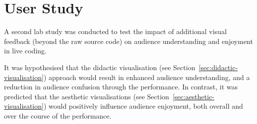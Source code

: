 
\chapter{User Study}
\label{chap:user-study}

A second lab study was conducted to test the impact of additional
visual feedback (beyond the raw source code) on audience understanding
and enjoyment in live coding.

It was hypothesised that the didactic visualisation (see Section~\ref{sec:didactic-visualisation}) approach would result in
enhanced audience understanding, and a reduction in audience confusion
through the performance. In contrast, it was predicted that the aesthetic
visualisations (see Section~\ref{sec:aesthetic-visualisation}) would positively influence audience enjoyment, both overall and over the course of the performance.






